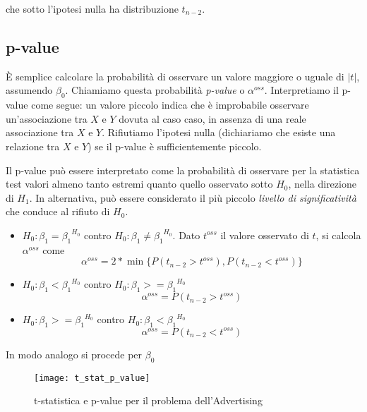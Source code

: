 che sotto l'ipotesi nulla ha distribuzione $t_{n-2}$.

\subsection{p-value}

È semplice calcolare la probabilità di osservare un valore maggiore o uguale di $|t|$, assumendo ${\beta}_0$. Chiamiamo questa probabilità \textit{p-value} o ${\alpha}^{oss}$. Interpretiamo il p-value come segue: un valore piccolo indica che è improbabile osservare un'associazione tra $X$ e $Y$ dovuta al caso caso, in assenza di una reale associazione tra  $X$ e $Y$. Rifiutiamo l'ipotesi nulla (dichiariamo che esiste una relazione tra $X$ e $Y$) se il p-value è sufficientemente piccolo.

Il p-value può essere interpretato come la probabilità di osservare per la statistica test valori almeno tanto estremi
quanto quello osservato sotto $H_0$, nella direzione di $H_1$. In alternativa, può essere considerato il più piccolo \textit{livello di significatività} che conduce al rifiuto di $H_0$.

\begin{itemize}
\item $H_{0}: {\beta}_1 = {{\beta}_1}^{H_0}$ contro $H_{0}: {\beta}_1 \neq {{\beta}_1}^{H_0}$. Dato $t^{oss}$ il valore osservato di $t$, si calcola ${\alpha}^{oss}$ come \begin{equation}
{\alpha}^{oss} = 2*\min\{P(t_{n-2} > t^{oss}),P(t_{n-2} < t^{oss})\}
\end{equation}
\item $H_{0}: {\beta}_1 < {{\beta}_1}^{H_0}$ contro $H_{0}: {\beta}_1 >= {{\beta}_1}^{H_0}$
\begin{equation}
{\alpha}^{oss} = P(t_{n-2} > t^{oss})
\end{equation}
\item $H_{0}: {\beta}_1 >= {{\beta}_1}^{H_0}$ contro $H_{0}: {\beta}_1 < {{\beta}_1}^{H_0}$
\begin{equation}
{\alpha}^{oss} = P(t_{n-2} < t^{oss})
\end{equation}
\end{itemize}

In modo analogo si procede per ${\beta}_0$

\begin{figure}[H]
\centering
\texttt{[image: t\_stat\_p\_value]}
\caption{t-statistica e p-value per il problema dell'Advertising}
\end{figure}

